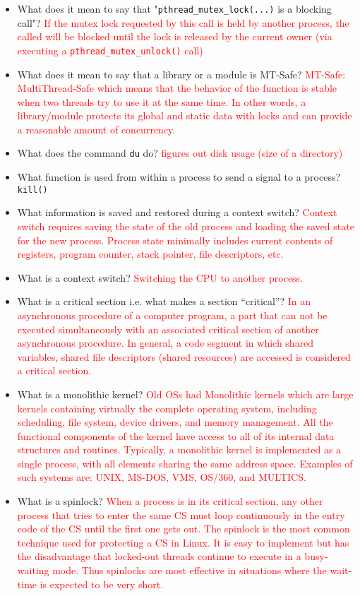 \documentclass[10pt,landscape]{article}
\newcommand{\answer}[1]{\textcolor{red}{#1}}
\begin{document}
\begin{multicols}{4}
\begin{itemize}
    \item What does it mean to say that "\verb$pthread_mutex_lock(...)$ is a blocking call"?  \answer{If the mutex lock requested by this call is held by another process, the called will be blocked until the lock is released by the current owner (via executing a \texttt{pthread\_mutex\_unlock()} call)}
    \item What does it mean to say that a library or a module is MT-Safe? \answer{MT-Safe: MultiThread-Safe which means that the behavior of the function is stable when two threads try to use it at the same time. In other words, a library/module protects its global and static data with locks and can provide a reasonable amount of concurrency.}
    \item  What does the command \verb$du$ do?  \answer{figures out disk usage (size of a directory)}
    \item What function is used from within a process to send a signal to a process? \verb$kill()$
    \item What information is saved and restored during a context switch? \answer{Context switch requires saving the state of the old process and loading the saved state for the new process. Process state minimally includes current contents of registers, program counter, stack pointer, file descriptors, etc.}
    \item What is a context switch? \answer{Switching the CPU to another process.}
    \item What is a critical section i.e. what makes a section ``critical''?  \answer{In an asynchronous procedure of a computer program, a part that can not be executed simultaneously with an associated critical section of another asynchronous procedure.  In general, a code segment in which shared variables,  shared file descriptors (shared resources) are accessed is considered a critical section.}
    \item What is a monolithic kernel? \answer{Old OSs had Monolithic kernels which are large kernels containing virtually the complete operating system, including scheduling, file system, device drivers, and memory management.  All the functional components of the kernel have access to all of its internal data structures and routines.  Typically, a monolithic kernel is implemented as a single process, with all elements sharing the same address space. Examples of such systems are: UNIX, MS-DOS, VMS, OS/360, and MULTICS.}
    \item What is a spinlock?  \answer{When a process is in its critical section, any other process that tries to enter the same CS must loop continuously in the entry code of the CS until the first one gets out. The spinlock is the most common technique used for protecting a CS in Linux. It is easy to implement but has the disadvantage that locked-out threads continue to execute in a busy-waiting mode. Thus spinlocks are most effective in situations where the wait-time is expected to be very short.}
\end{itemize}


\end{multicols}
\end{document}
